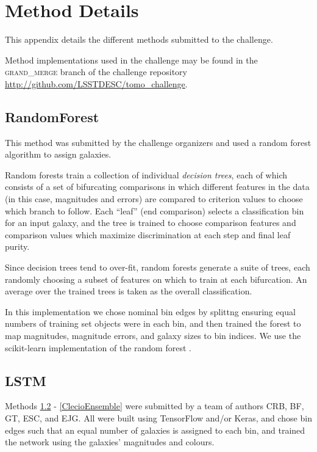 \documentclass[twocolumn,twocolappendix]{aastex63}
\begin{document}
\section{Method Details} \label{app:methods}
This appendix details the different methods submitted to the challenge.

Method implementations used in the challenge may be found in the \textsc{grand\_merge} branch
of the challenge repository \url{http://github.com/LSSTDESC/tomo_challenge}.

\subsection{ {\sc RandomForest} } \label{sec:randomforest}
This method was submitted by the challenge organizers and used a random
forest algorithm to assign galaxies.

Random forests \citep{breiman2001} train a collection of individual \emph{decision trees},
each of which consists of a set of bifurcating comparisons in which different features in
the data (in this case, magnitudes and errors) are compared to criterion values to choose
which branch to follow.  Each ``leaf'' (end comparison) selects a classification bin for
an input galaxy, and the tree is trained to choose comparison features and comparison values
which maximize discrimination at each step and final leaf purity.

Since decision trees tend to over-fit, random forests generate a suite of 
trees, each randomly choosing a subset of features on which to train at each bifurcation.
An average over the trained trees is taken as the overall classification.

In this implementation we chose nominal bin edges by splittng ensuring equal numbers of training set 
objects were in each bin, and then trained the forest to map magnitudes, magnitude errors, and
galaxy sizes to bin indices.  We use the {\sc scikit-learn} implementation of the random forest
\citep{scikit-learn}.


\subsection{ {\sc LSTM} } 
\label{ClecioLSTM} 
Methods \ref{ClecioLSTM} - \ref{ClecioEnsemble} were
submitted by a team of authors CRB, BF, GT, ESC, and EJG.  All were built using TensorFlow and/or Keras, and
chose bin edges such that an equal number of galaxies is assigned to each bin, and trained the
network using the galaxies' magnitudes and colours. 
\end{document}
